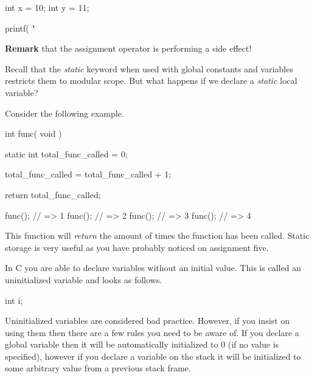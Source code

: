 \begin{code}[c]
int x = 10;
int y = 11;

printf( "%
\end{code}

\textbf{Remark} that the assignment operator is performing a side effect!


Recall that the \emph{static} keyword when used with global constants and variables restricts them to modular scope. But what happens if we declare a \emph{static} local variable? \\


Consider the following example.\\

\begin{code}[c]
int func( void ) {
	static int total_func_called = 0;
	
	total_func_called = total_func_called + 1;
	
	return total_func_called;
}

func(); // => 1
func(); // => 2
func(); // => 3
func(); // => 4
\end{code}

This function will \emph{return} the amount of times the function has been called. Static storage is very useful as you have probably noticed on assignment five.\\



In C you are able to declare variables without an initial value. This is called an uninitialized variable and looks as follows.\\

\begin{code}[c]
int i;
\end{code}

Uninitialized variables are considered bad practice. However, if you insist on using them then there are a few rules you need to be aware of. If you declare a global variable then it will be automatically initialized to 0 (if no value is specified), however if you declare a variable on the stack it will be initialized to some arbitrary value from a previous stack frame.\\

